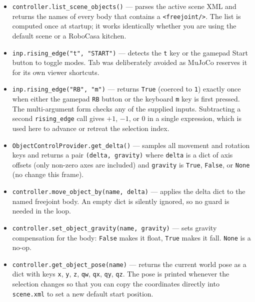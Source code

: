 \documentclass[11pt,a4paper]{article}
\begin{document}
\begin{itemize}
    \item \texttt{controller.list\_scene\_objects()} --- parses the active scene XML and returns the names of every body that contains a \texttt{<freejoint/>}. The list is computed once at startup; it works identically whether you are using the default scene or a RoboCasa kitchen.

    \item \texttt{inp.rising\_edge("t", "START")} --- detects the \texttt{t} key or the gamepad Start button to toggle modes. Tab was deliberately avoided as MuJoCo reserves it for its own viewer shortcuts.

    \item \texttt{inp.rising\_edge("RB", "m")} --- returns \texttt{True} (coerced to \texttt{1}) exactly once when either the gamepad \texttt{RB} button or the keyboard \texttt{m} key is first pressed. The multi-argument form checks any of the supplied inputs. Subtracting a second \texttt{rising\_edge} call gives $+1$, $-1$, or $0$ in a single expression, which is used here to advance or retreat the selection index.

    \item \texttt{ObjectControlProvider.get\_delta()} --- samples all movement and rotation keys and returns a pair \texttt{(delta, gravity)} where \texttt{delta} is a dict of axis offsets (only non-zero axes are included) and \texttt{gravity} is \texttt{True}, \texttt{False}, or \texttt{None} (no change this frame).

    \item \texttt{controller.move\_object\_by(name, delta)} --- applies the delta dict to the named freejoint body. An empty dict is silently ignored, so no guard is needed in the loop.

    \item \texttt{controller.set\_object\_gravity(name, gravity)} --- sets gravity compensation for the body: \texttt{False} makes it float, \texttt{True} makes it fall. \texttt{None} is a no-op.

    \item \texttt{controller.get\_object\_pose(name)} --- returns the current world pose as a dict with keys \texttt{x}, \texttt{y}, \texttt{z}, \texttt{qw}, \texttt{qx}, \texttt{qy}, \texttt{qz}. The pose is printed whenever the selection changes so that you can copy the coordinates directly into \texttt{scene.xml} to set a new default start position.
\end{itemize}
\end{document}
